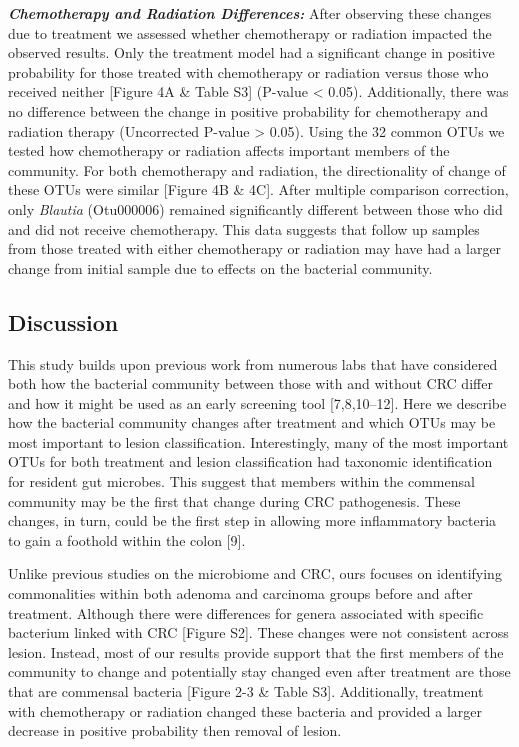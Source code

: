 \documentclass[12pt,]{article}
\begin{document}
\textbf{\emph{Chemotherapy and Radiation Differences:}} After observing
these changes due to treatment we assessed whether chemotherapy or
radiation impacted the observed results. Only the treatment model had a
significant change in positive probability for those treated with
chemotherapy or radiation versus those who received neither {[}Figure 4A
\& Table S3{]} (P-value \textless{} 0.05). Additionally, there was no
difference between the change in positive probability for chemotherapy
and radiation therapy (Uncorrected P-value \textgreater{} 0.05). Using
the 32 common OTUs we tested how chemotherapy or radiation affects
important members of the community. For both chemotherapy and radiation,
the directionality of change of these OTUs were similar {[}Figure 4B \&
4C{]}. After multiple comparison correction, only \emph{Blautia}
(Otu000006) remained significantly different between those who did and
did not receive chemotherapy. This data suggests that follow up samples
from those treated with either chemotherapy or radiation may have had a
larger change from initial sample due to effects on the bacterial
community.

\newpage

\subsection{Discussion}\label{discussion}

This study builds upon previous work from numerous labs that have
considered both how the bacterial community between those with and
without CRC differ and how it might be used as an early screening tool
{[}7,8,10--12{]}. Here we describe how the bacterial community changes
after treatment and which OTUs may be most important to lesion
classification. Interestingly, many of the most important OTUs for both
treatment and lesion classification had taxonomic identification for
resident gut microbes. This suggest that members within the commensal
community may be the first that change during CRC pathogenesis. These
changes, in turn, could be the first step in allowing more inflammatory
bacteria to gain a foothold within the colon {[}9{]}.

Unlike previous studies on the microbiome and CRC, ours focuses on
identifying commonalities within both adenoma and carcinoma groups
before and after treatment. Although there were differences for genera
associated with specific bacterium linked with CRC {[}Figure S2{]}.
These changes were not consistent across lesion. Instead, most of our
results provide support that the first members of the community to
change and potentially stay changed even after treatment are those that
are commensal bacteria {[}Figure 2-3 \& Table S3{]}. Additionally,
treatment with chemotherapy or radiation changed these bacteria and
provided a larger decrease in positive probability then removal of
lesion.
\end{document}
